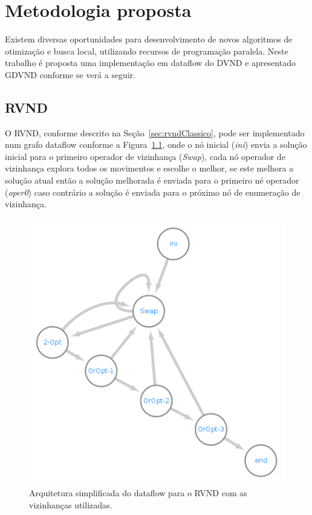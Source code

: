 \chapter{Metodologia proposta}\label{cap:metodologia}

Existem diversas oportunidades para desenvolvimento de novos algoritmos de otimização e busca local, utilizando recursos de programação paralela.
Neste trabalho é proposta uma implementação em dataflow do DVND e apresentado GDVND conforme se verá a seguir.

\section{RVND}

O RVND, conforme descrito na Seção~\ref{sec:rvndClassico}, pode ser implementado num grafo dataflow conforme a Figura~\ref{fig:rvndGraph}, onde o nó inicial (\textit{ini}) envia a solução inicial para o primeiro operador de vizinhança (\textit{Swap}), cada nó operador de vizinhança explora todos os movimentos e escolhe o melhor, se este melhora a solução atual então a solução melhorada é enviada para o primeiro né operador (\textit{oper0}) caso contrário a solução é enviada para o próximo nó de enumeração de vizinhança.

\begin{figure}[htbp]
    \centerline{\includegraphics[scale=0.5]{figuras/rvnd/RVND_dataflow_nomes.png}}
    \caption{Arquitetura simplificada do dataflow para o RVND com as vizinhanças utilizadas.}
    \label{fig:rvndGraph}
\end{figure}

